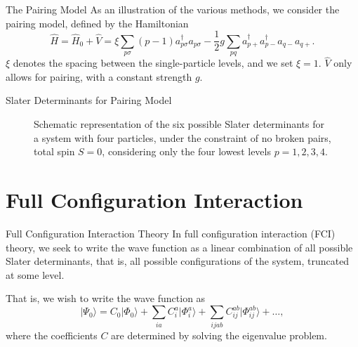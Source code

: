 \documentclass[UKenglish,aspectratio=169]{beamer}
\begin{document}
\begin{frame}{The Pairing Model}
    As an illustration of the various methods, we consider the pairing model, defined by the Hamiltonian
    \begin{equation}
        \hat{H}
        = \hat{H}_0 + \hat{V}
        = \xi \sum_{p\sigma} (p - 1) a^\dagger_{p\sigma} a_{p\sigma} - \frac{1}{2} g \sum_{pq} a^\dagger_{p+} a^\dagger_{p-} a_{q-} a_{q+}.
    \end{equation}
    $\xi$ denotes the spacing between the single-particle levels, and we set $\xi = 1$.
    $\hat{V}$ only allows for pairing, with a constant strength $g$.
\end{frame}

\begin{frame}{Slater Determinants for Pairing Model}
    \begin{figure}[htbp]
        \centering
        
        \caption{
            Schematic representation of the six possible Slater
            determinants for a system with four particles, under the
            constraint of no broken pairs, total spin $S = 0$,
            considering only the four lowest levels $p = 1, 2, 3,
            4$.\label{fig:SDs}
        }
    \end{figure}
\end{frame}

\section{Full Configuration Interaction}

\begin{frame}{Full Configuration Interaction Theory}
    In full configuration interaction (FCI) theory, we seek to write
    the wave function as a linear combination of all possible Slater
    determinants, that is, all possible configurations of the system,
    truncated at some level.

    \bigskip

    That is, we wish to write the wave function as
    \begin{equation}\label{eq:FCI_wavefunction}
        \lvert \Psi_0 \rangle
        = C_0 \lvert \Phi_0 \rangle
        + \sum_{ia} C_i^a \lvert \Phi_i^a \rangle
        + \sum_{ijab} C_{ij}^{ab} \lvert \Phi_{ij}^{ab} \rangle
        + \ldots,
    \end{equation}
    where the coefficients $C$ are determined by solving the eigenvalue problem.
\end{frame}
\end{document}
